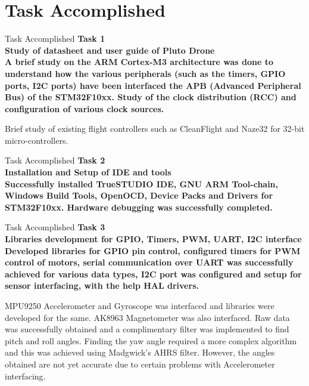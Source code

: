\documentclass[10pt, a4paper]{beamer}
\begin{document}
\section{Task Accomplished}
\begin{frame}{Task Accomplished}
\bfseries Task 1\\ Study of datasheet and user guide of Pluto Drone\\ \hfill \break
\mdseries A brief study on the ARM Cortex-M3 architecture was done to understand how the various peripherals (such as the timers, GPIO ports, I2C ports) have been interfaced the APB (Advanced Peripheral Bus) of the STM32F10xx. Study of the clock distribution (RCC) and configuration of various clock sources.\hfill \break

Brief study of existing flight controllers such as CleanFlight  and Naze32 for 32-bit micro-controllers.
\end{frame}

\begin{frame}{Task Accomplished}
\bfseries Task 2\\ Installation and Setup of IDE and tools\\ \hfill \break
\mdseries Successfully installed TrueSTUDIO IDE, GNU ARM Tool-chain, Windows Build Tools, OpenOCD, Device Packs and Drivers for STM32F10xx. Hardware debugging was successfully completed.
\end{frame}

\begin{frame}{Task Accomplished}
\bfseries Task 3\\ Libraries development for GPIO, Timers, PWM, UART, I2C interface\\ \hfill \break
\mdseries Developed libraries for GPIO pin control, configured timers for PWM control of motors, serial communication over UART was successfully achieved for various data types, I2C port was configured and setup for sensor interfacing, with the help HAL drivers.\hfill \break

MPU9250 Accelerometer and Gyroscope was interfaced and libraries were developed for the same. AK8963 Magnetometer was also interfaced. Raw data was successfully obtained and a complimentary filter was implemented to find pitch and roll angles. Finding the yaw angle required a more complex algorithm and this was achieved using Madgwick's AHRS filter. However, the angles obtained are not yet accurate due to certain problems with Accelerometer interfacing.
\end{frame}
\end{document}
